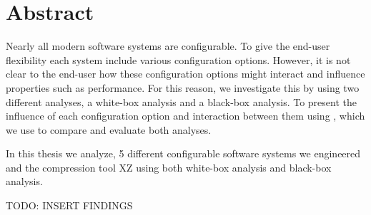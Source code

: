 \begingroup
\let\clearpage\relax
\let\cleardoublepage\relax
\let\cleardoublepage\relax

\chapter*{Abstract}
Nearly all modern software systems are configurable. To give the end-user flexibility each system include various configuration options.
However, it is not clear to the end-user how these configuration options might interact and influence properties such as performance. 
For this reason, we investigate this by using two different analyses, a white-box analysis and a black-box analysis. 
To present the influence of each configuration option and interaction between them using {\perfInfluenceModel}, which we use 
to compare and evaluate both analyses.

In this thesis we analyze, 5 different configurable software systems we engineered and the compression tool \textsc{XZ} using both white-box analysis
and black-box analysis.

TODO: INSERT FINDINGS

\vfill

\endgroup

\vfill
